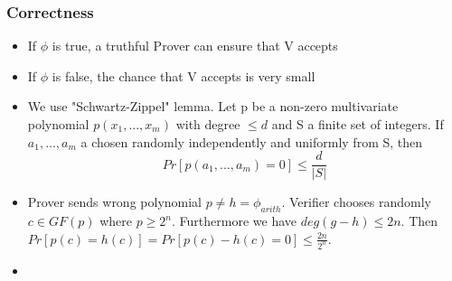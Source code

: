 \documentclass[hyperref={pdfpagelabels=false},t,10pt]{beamer}
\begin{document}
\begin{frame}
  \frametitle{Correctness}
  \begin{itemize}
    \item If $\phi$ is true, a truthful Prover can ensure that V accepts \pause
    \item If $\phi$ is false, the chance that V accepts is very small \pause
    \item We use "Schwartz-Zippel" lemma. Let p be a non-zero multivariate polynomial $p(x_1,...,x_m)$ with degree $\leq d$ and S a finite set of integers.
    If $a_1,..., a_m$ a chosen randomly independently and uniformly from S, then $$Pr[p(a_1,...,a_m)= 0] \leq \frac{d}{|S|}$$
    \item Prover sends wrong polynomial $p \neq h =\phi_{arith}$. Verifier chooses randomly $c\in GF(p)$ where $p\geq 2^n$. Furthermore we have $deg(g-h) \leq 2n$. \pause
    Then $Pr[p(c) = h(c)] = Pr[p(c) - h(c) = 0] \leq \frac{2n}{2^n}$.
    \item 
  \end{itemize}
\end{frame}
\end{document}
